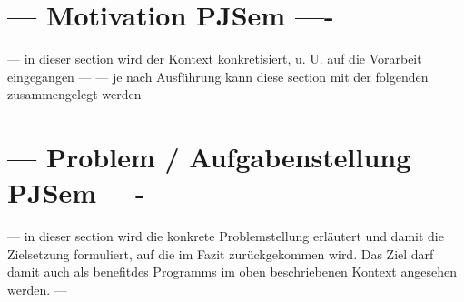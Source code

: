 \documentclass[../Report.tex]{subfiles}
\begin{document}
\section{ --- Motivation PJSem ---- }
\label{sec:einf.motivation}
--- in dieser section wird der Kontext konkretisiert, u. U. auf die Vorarbeit eingegangen --- 
--- je nach Ausführung kann diese section mit der folgenden zusammengelegt werden --- 

\section{ --- Problem / Aufgabenstellung PJSem ---- }
\label{sec:einf.problem}
--- in dieser section wird die konkrete Problemstellung erläutert und damit die Zielsetzung formuliert, 
auf die im Fazit zurückgekommen wird. Das Ziel darf damit auch als \glqq benefit\grqq des Programms im oben beschriebenen Kontext angesehen werden. --- 
\\
\end{document}
